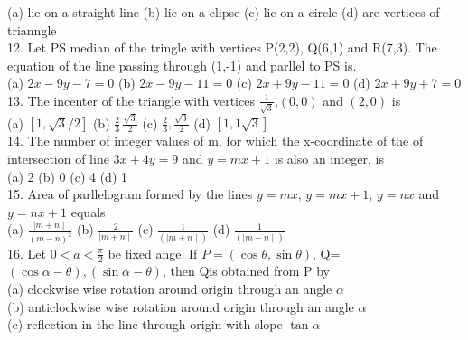 \documentclass[12pt]{article}
\begin{document}
(a)  lie on a straight line \hspace{1cm}  (b)   lie on a elipse \hspace{1cm}  (c)  lie on a circle  \hspace{1cm} (d)   are vertices of trianngle \\
12. Let PS median of the tringle with vertices P(2,2), Q(6,1) and R(7,3). The equation of the line passing through (1,-1) and parllel to PS is.\\
(a)  $2x-9y-7=0$ \hspace{1cm}  (b)   $2x-9y-11=0$ \hspace{1cm}  (c)  $2x+9y-11=0$ \hspace{1cm} (d)  $2x+9y+7=0$\\
13. The incenter of the triangle with vertices $\frac{1}{\sqrt{3}}$,$(0,0)$ and $(2,0)$ is\\
(a) $[1,\sqrt{3}/2]$ \hspace{1cm} (b)  $\frac{2}{3}\,\frac{\sqrt{3}}{2}$ \hspace{1cm} (c)  $\frac{2}{3},\frac{\sqrt{3}}{2}$  \hspace{1cm} (d)  $[1,{1}{\sqrt{3}}]$\\
14. The number of integer values of m, for which the x-coordinate of the of intersection of line $3x+4y=9$ and $y=mx+1$ is also an integer, is\\
(a)  2  \hspace{1cm} (b)  0 \hspace{1cm} (c)  4   \hspace{1cm} (d)  1\\
15. Area of parllelogram formed by the lines $y=mx$, $y=mx+1$,  $y=nx$ and  $y=nx+1$ equals\\
(a) $\frac{\mid m+n\mid}{(m-n)^2}$\hspace{1cm}
(b) $\frac{2}{\mid m+n \mid}$\hspace{1cm}
(c) $\frac{1}{(\mid m+n \mid)}$\hspace{1cm}
(d) $\frac{1}{(\mid m-n\mid)}$\\
16. Let $0<a<\frac{\pi}{2}$ be fixed ange. If $P=(\cos\theta,\sin\theta)$, Q=$(\cos\alpha-\theta),(\sin\alpha-\theta)$, then Qis obtained from P by\\
(a)  clockwise wise rotation around origin through an angle $\alpha$\\
(b) anticlockwise wise rotation around origin through an angle $\alpha$\\
(c) reflection in the line through origin with slope $\tan\alpha$\\
\end{document}
